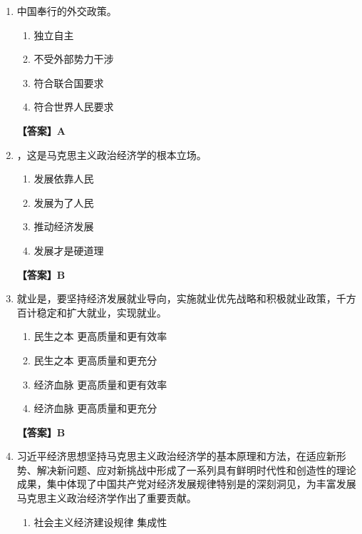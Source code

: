 \documentclass[UTF8,11pt,a4paper]{ctexart}
\begin{document}
\begin{enumerate}[label=\textbf{\arabic*.}, leftmargin=2.5em, itemsep=0.7em]
\begin{enumerate}[label=\Alph*., leftmargin=2em, itemsep=0.1em, topsep=0.15em]
\end{enumerate}
\textbf{【答案】A}
\item 中国奉行\allowbreak\underline{\hspace{4em}}的外交政策。
\begin{enumerate}[label=\Alph*., leftmargin=2em, itemsep=0.1em, topsep=0.15em]
\item 独立自主
\item 不受外部势力干涉
\item 符合联合国要求
\item 符合世界人民要求
\end{enumerate}
\textbf{【答案】A}
\item \allowbreak\underline{\hspace{4em}}，这是马克思主义政治经济学的根本立场。
\begin{enumerate}[label=\Alph*., leftmargin=2em, itemsep=0.1em, topsep=0.15em]
\item 发展依靠人民
\item 发展为了人民
\item 推动经济发展
\item 发展才是硬道理
\end{enumerate}
\textbf{【答案】B}
\item 就业是\allowbreak\underline{\hspace{4em}}，要坚持经济发展就业导向，实施就业优先战略和积极就业政策，千方百计稳定和扩大就业，实现\allowbreak\underline{\hspace{4em}}就业。
\begin{enumerate}[label=\Alph*., leftmargin=2em, itemsep=0.1em, topsep=0.15em]
\item 民生之本 更高质量和更有效率
\item 民生之本 更高质量和更充分
\item 经济血脉 更高质量和更有效率
\item 经济血脉 更高质量和更充分
\end{enumerate}
\textbf{【答案】B}
\item 习近平经济思想坚持马克思主义政治经济学的基本原理和方法，在适应新形势、解决新问题、应对新挑战中形成了一系列具有鲜明时代性和创造性的理论成果，集中体现了中国共产党对经济发展规律特别是\allowbreak\underline{\hspace{4em}}的深刻洞见，为丰富发展马克思主义政治经济学作出了重要\allowbreak\underline{\hspace{4em}}贡献。
\begin{enumerate}[label=\Alph*., leftmargin=2em, itemsep=0.1em, topsep=0.15em]
\item 社会主义经济建设规律 集成性

\end{enumerate}
\end{enumerate}
\end{document}
